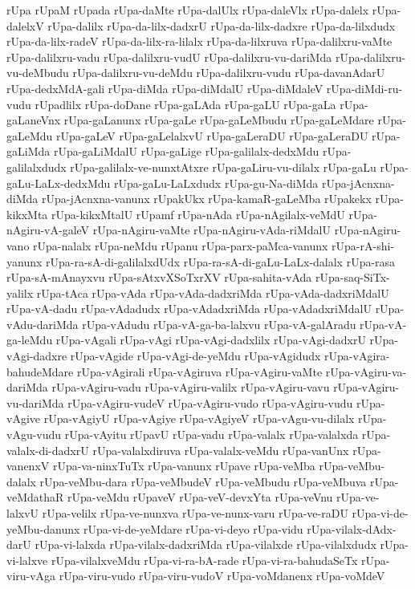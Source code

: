 {rUpa
rUpaM
rUpada
rUpa-daMte
rUpa-dalUlx
rUpa-daleVlx
rUpa-dalelx
rUpa-dalelxV
rUpa-dalilx
rUpa-da-lilx-dadxrU
rUpa-da-lilx-dadxre
rUpa-da-lilxdudx
rUpa-da-lilx-radeV
rUpa-da-lilx-ra-lilalx
rUpa-da-lilxruva
rUpa-dalilxru-vaMte
rUpa-dalilxru-vadu
rUpa-dalilxru-vudU
rUpa-dalilxru-vu-dariMda
rUpa-dalilxru-vu-deMbudu
rUpa-dalilxru-vu-deMdu
rUpa-dalilxru-vudu
rUpa-davanAdarU
rUpa-dedxMdA-gali
rUpa-diMda
rUpa-diMdalU
rUpa-diMdaleV
rUpa-diMdi-ru-vudu
rUpadlilx
rUpa-doDane
rUpa-gaLAda
rUpa-gaLU
rUpa-gaLa
rUpa-gaLaneVnx
rUpa-gaLanunx
rUpa-gaLe
rUpa-gaLeMbudu
rUpa-gaLeMdare
rUpa-gaLeMdu
rUpa-gaLeV
rUpa-gaLelalxvU
rUpa-gaLeraDU
rUpa-gaLeraDU
rUpa-gaLiMda
rUpa-gaLiMdalU
rUpa-gaLige
rUpa-galilalx-dedxMdu
rUpa-galilalxdudx
rUpa-galilalx-ve-nunxtAtxre
rUpa-gaLiru-vu-dilalx
rUpa-gaLu
rUpa-gaLu-LaLx-dedxMdu
rUpa-gaLu-LaLxdudx
rUpa-gu-Na-diMda
rUpa-jAcnxna-diMda
rUpa-jAcnxna-vanunx
rUpakUkx
rUpa-kamaR-gaLeMba
rUpakekx
rUpa-kikxMta
rUpa-kikxMtalU
rUpamf
rUpa-nAda
rUpa-nAgilalx-veMdU
rUpa-nAgiru-vA-galeV
rUpa-nAgiru-vaMte
rUpa-nAgiru-vAda-riMdalU
rUpa-nAgiru-vano
rUpa-nalalx
rUpa-neMdu
rUpanu
rUpa-parx-paMca-vanunx
rUpa-rA-shi-yanunx
rUpa-ra-sA-di-galilalxdUdx
rUpa-ra-sA-di-gaLu-LaLx-dalalx
rUpa-rasa
rUpa-sA-mAnayxvu
rUpa-sAtxvXSoTxrXV
rUpa-sahita-vAda
rUpa-saq-SiTx-yalilx
rUpa-tAca
rUpa-vAda
rUpa-vAda-dadxriMda
rUpa-vAda-dadxriMdalU
rUpa-vA-dadu
rUpa-vAdadudx
rUpa-vAdadxriMda
rUpa-vAdadxriMdalU
rUpa-vAdu-dariMda
rUpa-vAdudu
rUpa-vA-ga-ba-lalxvu
rUpa-vA-galAradu
rUpa-vA-ga-leMdu
rUpa-vAgali
rUpa-vAgi
rUpa-vAgi-dadxlilx
rUpa-vAgi-dadxrU
rUpa-vAgi-dadxre
rUpa-vAgide
rUpa-vAgi-de-yeMdu
rUpa-vAgidudx
rUpa-vAgira-bahudeMdare
rUpa-vAgirali
rUpa-vAgiruva
rUpa-vAgiru-vaMte
rUpa-vAgiru-va-dariMda
rUpa-vAgiru-vadu
rUpa-vAgiru-valilx
rUpa-vAgiru-vavu
rUpa-vAgiru-vu-dariMda
rUpa-vAgiru-vudeV
rUpa-vAgiru-vudo
rUpa-vAgiru-vudu
rUpa-vAgive
rUpa-vAgiyU
rUpa-vAgiye
rUpa-vAgiyeV
rUpa-vAgu-vu-dilalx
rUpa-vAgu-vudu
rUpa-vAyitu
rUpavU
rUpa-vadu
rUpa-valalx
rUpa-valalxda
rUpa-valalx-di-dadxrU
rUpa-valalxdiruva
rUpa-valalx-veMdu
rUpa-vanUnx
rUpa-vanenxV
rUpa-va-ninxTuTx
rUpa-vanunx
rUpave
rUpa-veMba
rUpa-veMbu-dalalx
rUpa-veMbu-dara
rUpa-veMbudeV
rUpa-veMbudu
rUpa-veMbuva
rUpa-veMdathaR
rUpa-veMdu
rUpaveV
rUpa-veV-devxYta
rUpa-veVnu
rUpa-ve-lalxvU
rUpa-velilx
rUpa-ve-nunxva
rUpa-ve-nunx-varu
rUpa-ve-raDU
rUpa-vi-de-yeMbu-danunx
rUpa-vi-de-yeMdare
rUpa-vi-deyo
rUpa-vidu
rUpa-vilalx-dAdx-darU
rUpa-vi-lalxda
rUpa-vilalx-dadxriMda
rUpa-vilalxde
rUpa-vilalxdudx
rUpa-vi-lalxve
rUpa-vilalxveMdu
rUpa-vi-ra-bA-rade
rUpa-vi-ra-bahudaSeTx
rUpa-viru-vAga
rUpa-viru-vudo
rUpa-viru-vudoV
rUpa-voMdanenx
rUpa-voMdeV
}
